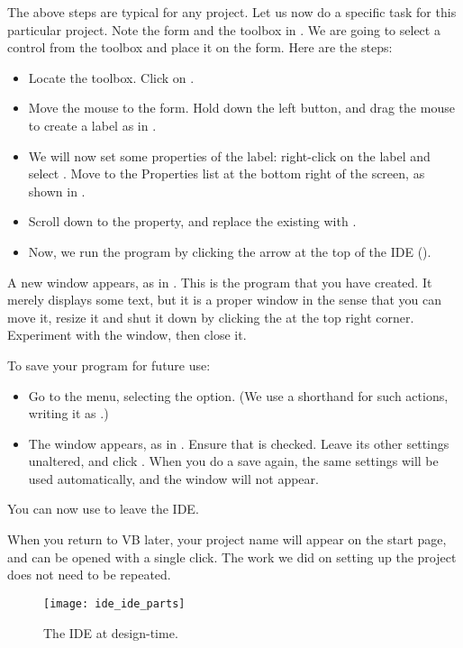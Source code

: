 		
		The above steps are typical for any project. Let us now do a specific task for this particular project.
Note the form and the toolbox in . We are going to select a control from the toolbox and place it on the form. Here are the steps:
		\begin{itemize}
			\item	Locate the toolbox. Click on .
			\item	Move the mouse to the form. Hold down the left button, and drag the mouse to create a label as in .
			\item	We will now set some properties of the label: right-click on the label and select . Move to the Properties list at the bottom right of the screen, as shown in .
			\item	Scroll down to the  property, and replace the existing  with .
			\item	Now, we run the program by clicking the arrow at the top of the IDE ().
		\end{itemize}
		A new window appears, as in . This is the program that you have created. It merely displays some text, but it is a proper window in the sense that you can move it, resize it and shut it down by clicking the  at the top right corner. Experiment with the window, then close it.

		To save your program for future use:
		\begin{itemize}
			\item	Go to the  menu, selecting the  option. (We use a shorthand for such actions, writing it as .)
			\item	The  window appears, as in . Ensure that  is checked. Leave its other settings unaltered, and click . When you do a save again, the same settings will be used automatically, and the  window will not appear.
		\end{itemize}
		You can now use  to leave the IDE.

		When you return to VB later, your project name will appear on the start page, and can be opened with a single click. The work we did on setting up the project does not need to be repeated.

		\begin{figure}[ht]
			\centering
			\texttt{[image: ide\_ide\_parts]}
			\caption{The IDE at design-time.}
			\label{fig:ide_ide_parts}
		\end{figure}

